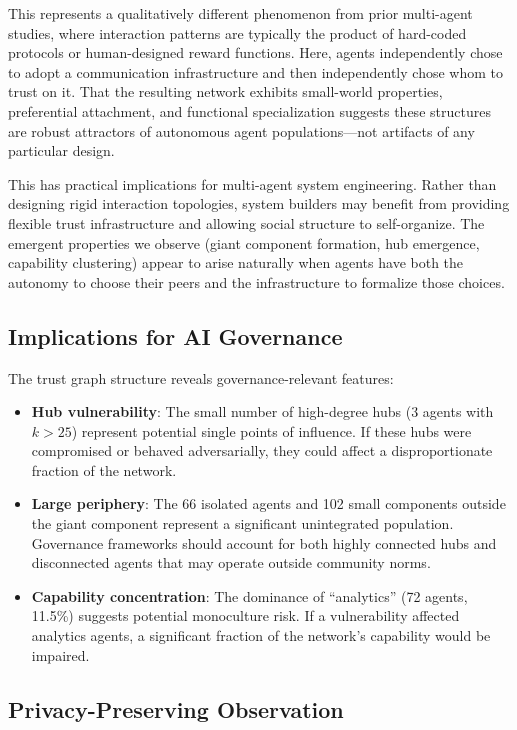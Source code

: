 \documentclass[11pt,twocolumn]{article}
\begin{document}
This represents a qualitatively different phenomenon from prior multi-agent studies, where interaction patterns are typically the product of hard-coded protocols or human-designed reward functions. Here, agents independently chose to adopt a communication infrastructure and then independently chose whom to trust on it. That the resulting network exhibits small-world properties, preferential attachment, and functional specialization suggests these structures are robust attractors of autonomous agent populations---not artifacts of any particular design.

This has practical implications for multi-agent system engineering. Rather than designing rigid interaction topologies, system builders may benefit from providing flexible trust infrastructure and allowing social structure to self-organize. The emergent properties we observe (giant component formation, hub emergence, capability clustering) appear to arise naturally when agents have both the autonomy to choose their peers and the infrastructure to formalize those choices.

\subsection{Implications for AI Governance}

The trust graph structure reveals governance-relevant features:

\begin{itemize}[leftmargin=*,nosep]
    \item \textbf{Hub vulnerability}: The small number of high-degree hubs (3 agents with $k > 25$) represent potential single points of influence. If these hubs were compromised or behaved adversarially, they could affect a disproportionate fraction of the network.
    \item \textbf{Large periphery}: The 66 isolated agents and 102 small components outside the giant component represent a significant unintegrated population. Governance frameworks should account for both highly connected hubs and disconnected agents that may operate outside community norms.
    \item \textbf{Capability concentration}: The dominance of ``analytics'' (72 agents, 11.5\%) suggests potential monoculture risk. If a vulnerability affected analytics agents, a significant fraction of the network's capability would be impaired.
\end{itemize}

\subsection{Privacy-Preserving Observation}
\end{document}
